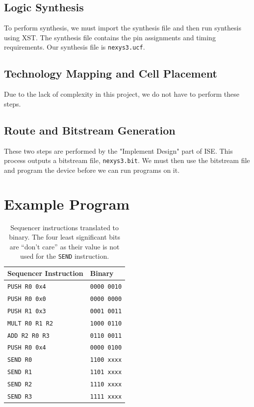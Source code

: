 \documentclass[]{article}
\begin{document}
\subsection{Logic Synthesis}

To perform synthesis, we must import the synthesis file and then run synthesis using XST. The synthesis file contains the pin assignments and timing requirements. Our synthesis file is \texttt{nexys3.ucf}.

\subsection{Technology Mapping and Cell Placement}

Due to the lack of complexity in this project, we do not have to perform these steps.

\subsection{Route and Bitstream Generation}

These two steps are performed by the "Implement Design" part of ISE. This process outputs a bitstream file, \texttt{nexys3.bit}. We must then use the bitstream file and program the device before we can run programs on it.

\section{Example Program}

\begin{table}[H]
\centering
\begin{tabular}{ l | l }
\textbf{Sequencer Instruction} & \textbf{Binary}\\\hline
\texttt{PUSH R0 0x4} & \texttt{0000 0010}\\
\texttt{PUSH R0 0x0} & \texttt{0000 0000}\\
\texttt{PUSH R1 0x3} & \texttt{0001 0011}\\
\texttt{MULT R0 R1 R2} & \texttt{1000 0110}\\
\texttt{ADD R2 R0 R3} & \texttt{0110 0011}\\
\texttt{PUSH R0 0x4} & \texttt{0000 0100}\\
\texttt{SEND R0} & \texttt{1100  xxxx}\\
\texttt{SEND R1} & \texttt{1101  xxxx}\\
\texttt{SEND R2} & \texttt{1110  xxxx}\\
\texttt{SEND R3} & \texttt{1111  xxxx}\\
\end{tabular}
\caption{Sequencer instructions translated to binary. The four least significant bits are ``don't care'' as their value is not used for the \texttt{SEND} instruction.}
\label{table:translation}
\end{table}
\end{document}
